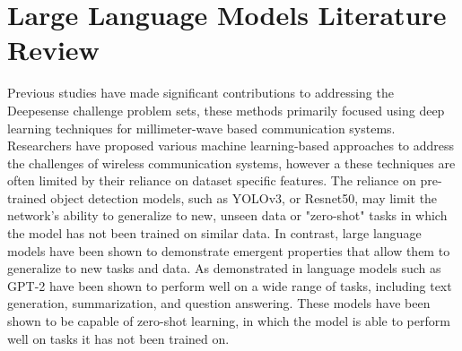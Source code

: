 \section{Large Language Models Literature Review}
Previous studies have made significant contributions to addressing the Deepesense challenge problem sets, these methods primarily focused using deep learning techniques for millimeter-wave based communication systems. Researchers have proposed various machine learning-based approaches to address the challenges of wireless communication systems, however a these techniques are often limited by their reliance on dataset specific features. The reliance on pre-trained object detection models, such as YOLOv3, or Resnet50, may limit the network's ability to generalize to new, unseen data or "zero-shot" tasks in which the model has not been trained on similar data. In contrast, large language models have been shown to demonstrate emergent properties that allow them to generalize to new tasks and data. As demonstrated in \cite{radford2019language} language models such as GPT-2 have been shown to perform well on a wide range of tasks, including text generation, summarization, and question answering. These models have been shown to be capable of zero-shot learning, in which the model is able to perform well on tasks it has not been trained on. 



